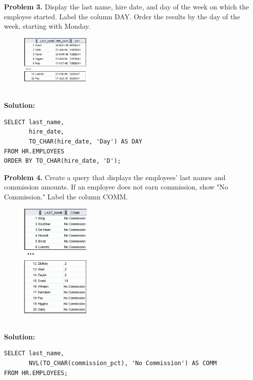\documentclass[12pt,a4paper]{article}
\begin{document}
\vspace{0.5cm}

\textbf{Problem 3.} Display the last name, hire date, and day of the week on which the employee started. Label the column DAY. Order the results by the day of the week, starting with Monday.
\begin{figure}[htbp]
  \centering
  \includegraphics[width=0.3\textwidth]{Screenshots/43.png}
\end{figure}\\
\textbf{Solution:}
\begin{lstlisting}[style=sqlstyle]
SELECT last_name,
       hire_date,
       TO_CHAR(hire_date, 'Day') AS DAY
FROM HR.EMPLOYEES
ORDER BY TO_CHAR(hire_date, 'D');
\end{lstlisting}

\vspace{0.5cm}

\textbf{Problem 4.} Create a query that displays the employees' last names and commission amounts. If an employee does not earn commission, show "No Commission." Label the column COMM.
\begin{figure}[htbp]
  \centering
  \includegraphics[width=0.3\textwidth]{Screenshots/44.png}
\end{figure}\\
\textbf{Solution:}
\begin{lstlisting}[style=sqlstyle]
SELECT last_name,
       NVL(TO_CHAR(commission_pct), 'No Commission') AS COMM
FROM HR.EMPLOYEES;
\end{lstlisting}

\vspace{0.5cm}
\end{document}
